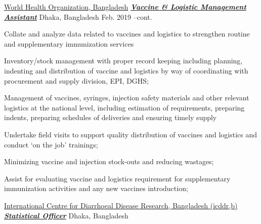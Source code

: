 

\begin{cventries}

  \cventry
    {\href{http://www.searo.who.int/bangladesh/en/}{World Health Organization, Bangladesh}} %
    {\href{https://www.dropbox.com/sh/bg88dnmjpcicdmn/AACdPh__4UdzmbZgx1FtOz3sa?dl=0}{\textbf {\textit {Vaccine \& Logistic Management Assistant}}}} %
    {Dhaka, Bangladesh} %
    {Feb. 2019 --cont.} %
    {
      \begin{cvitems} %
	\item {Collate and analyze data related to vaccines and logistics to strengthen routine and supplementary immunization services}
	\item {Inventory/stock management with proper record keeping including planning, indenting and distribution of vaccine and logistics by way of coordinating with procurement and supply division, EPI, DGHS; }
	\item {Management of vaccines, syringes, injection safety materials and other relevant logistics at the national level, including estimation of requirements, preparing indents, preparing schedules of deliveries and ensuring timely supply}
	\item {Undertake field visits to support quality distribution of vaccines and logistics and conduct ‘on the job’ trainings;}
	\item {Minimizing vaccine and injection stock-outs and reducing wastages; }
	\item {Assist for evaluating vaccine and logistics requirement for supplementary immunization activities and any new vaccines introduction; }
      \end{cvitems}
    }
  \cventry
    {\href{http://www.icddrb.org/}{International Centre for Diarrhoeal Disease Research, Bangladesh (icddr,b)}} %
   {\href{https://www.dropbox.com/sh/bg88dnmjpcicdmn/AACdPh__4UdzmbZgx1FtOz3sa?dl=0}{\textbf {\textit {Statistical Officer}}}} 
    {Dhaka, Bangladesh} %

\end{cventries}
